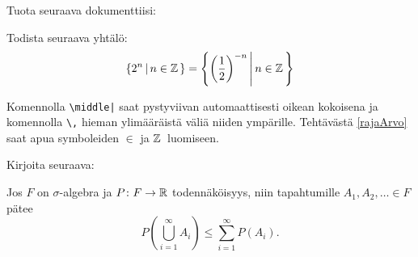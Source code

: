 \begin{fframe}
    \begin{harj}
        Tuota seuraava dokumenttiisi:
        \begin{sample}
            Todista seuraava yhtälö:
            \[
                \left\lbrace 2^n \,\middle|\, n\in\mathbb{Z}\,\right\rbrace=\left\lbrace \left(\frac{1}{2}\right)^{-n}\,\middle|\, n\in\mathbb{Z}\,\right\rbrace
            \]
        \end{sample}
        Komennolla \lstinline-\middle|- saat pystyviivan automaattisesti oikean kokoisena ja komennolla \lstinline-\,- hieman ylimääräistä väliä niiden ympärille. Tehtävästä \ref{rajaArvo} saat apua symboleiden \(\in\) ja \(\mathbb{Z}\,\) luomiseen.
    \end{harj}
\end{fframe}
\begin{fframe}
    \begin{harj}
        Kirjoita seuraava:
        \begin{sample}
            Jos \(F\) on \(\sigma\)-algebra ja \(P\colon F\to\mathbb{R}\) todennäköisyys, niin tapahtumille \(A_1,A_2,\dotsc\in F\) pätee
            \[
                P\left(\bigcup_{i=1}^\infty A_i\right) \leq \sum_{i=1}^\infty P(A_i).
            \]
        \end{sample}
    \end{harj}
\end{fframe}

